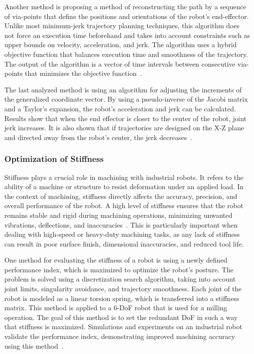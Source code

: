 \documentclass[conference]{IEEEtran}
\begin{document}
Another method is proposing a method of reconstructing the path by a sequence of via-points that define the positions and orientations of the robot's end-effector. Unlike most minimum-jerk trajectory planning techniques, this algorithm does not force an execution time beforehand and takes into account constraints such as upper bounds on velocity, acceleration, and jerk. The algorithm uses a hybrid objective function that balances execution time and smoothness of the trajectory. The output of the algorithm is a vector of time intervals between consecutive via-points that minimizes the objective function~\cite{Gasparetto.2010}. 


The last analyzed method is using an algorithm for adjusting the increments of the generalized coordinate vector. By using a pseudo-inverse of the Jacobi matrix and a Taylor’s expansion, the robot's acceleration and jerk can be calculated. Results show that when the end effector is closer to the center of the robot, joint jerk increases. It is also shown that if trajectories are designed on the X-Z plane and directed away from the robot's center, the jerk decreases~\cite{Duong.2021}.\newline

\subsubsection{Optimization of Stiffness}\label{OOS}
Stiffness plays a crucial role in machining with industrial robots. It refers to the ability of a machine or structure to resist deformation under an applied load. In the context of machining, stiffness directly affects the accuracy, precision, and overall performance of the robot. A high level of stiffness ensures that the robot remains stable and rigid during machining operations, minimizing unwanted vibrations, deflections, and inaccuracies~\cite{Wu.2022}. This is particularly important when dealing with high-speed or heavy-duty machining tasks, as any lack of stiffness can result in poor surface finish, dimensional inaccuracies, and reduced tool life. 

One method for evaluating the stiffness of a robot is using a newly defined performance index, which is maximized to optimize the robot's posture. The problem is solved using a discretization search algorithm, taking into account joint limits, singularity avoidance, and trajectory smoothness. 
Each joint of the robot is modeled as a linear torsion spring, which is transferred into a stiffness matrix. This method is applied to a 6-DoF robot that is used for a milling operation. The goal of this method is to set the redundant DoF in such a way that stiffness is maximized. Simulations and experiments on an industrial robot validate the performance index, demonstrating improved machining accuracy using this method~\cite{Xiong.2019}.
\end{document}
